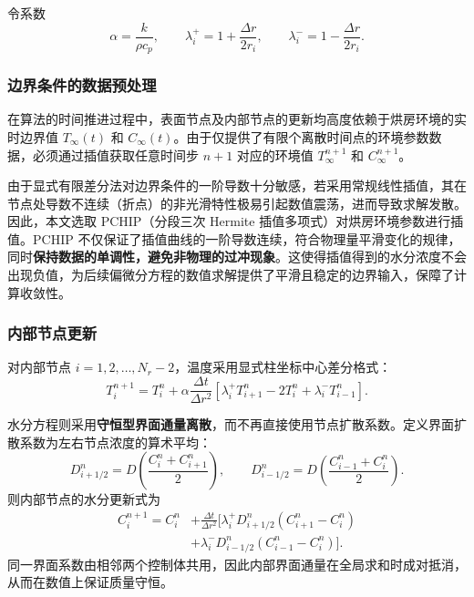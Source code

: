 \documentclass[withoutpreface,bwprint]{cumcm_thesis}
\begin{document}
令系数
\begin{equation}
\alpha = \frac{k}{\rho c_p}, \qquad \lambda_i^+ = 1 + \frac{\Delta r}{2r_i}, \qquad \lambda_i^- = 1 - \frac{\Delta r}{2r_i}.
\end{equation}

\subsubsection{边界条件的数据预处理}

在算法的时间推进过程中，表面节点及内部节点的更新均高度依赖于烘房环境的实时边界值 \(T_\infty(t)\) 和 \(C_\infty(t)\)。由于仅提供了有限个离散时间点的环境参数数据，必须通过插值获取任意时间步 \(n+1\) 对应的环境值 \(T_\infty^{n+1}\) 和 \(C_\infty^{n+1}\)。

由于显式有限差分法对边界条件的一阶导数十分敏感，若采用常规线性插值，其在节点处导数不连续（折点）的非光滑特性极易引起数值震荡，进而导致求解发散。因此，本文选取 PCHIP（分段三次 Hermite 插值多项式）对烘房环境参数进行插值。PCHIP 不仅保证了插值曲线的一阶导数连续，符合物理量平滑变化的规律，同时\textbf{保持数据的单调性，避免非物理的过冲现象}。这使得插值得到的水分浓度不会出现负值，为后续偏微分方程的数值求解提供了平滑且稳定的边界输入，保障了计算收敛性。

\subsubsection{内部节点更新}

对内部节点 \(i = 1,2,\dots,N_r-2\)，温度采用显式柱坐标中心差分格式：
\begin{equation}
T_i^{n+1} = T_i^n + \alpha \frac{\Delta t}{\Delta r^2} \left[ \lambda_i^+ T_{i+1}^n - 2T_i^n + \lambda_i^- T_{i-1}^n \right].
\end{equation}

水分方程则采用\textbf{守恒型界面通量离散}，而不再直接使用节点扩散系数。定义界面扩散系数为左右节点浓度的算术平均：
\begin{equation}
D_{i+1/2}^n = D\left( \frac{C_i^n + C_{i+1}^n}{2} \right), \qquad D_{i-1/2}^n = D\left( \frac{C_{i-1}^n + C_i^n}{2} \right).
\end{equation}
则内部节点的水分更新式为
\begin{equation}
\begin{aligned}
C_i^{n+1} = C_i^n &+ \frac{\Delta t}{\Delta r^2} \Big[ \lambda_i^+ D_{i+1/2}^n (C_{i+1}^n - C_i^n) \\
&+ \lambda_i^- D_{i-1/2}^n (C_{i-1}^n - C_i^n) \Big].
\end{aligned}
\end{equation}
同一界面系数由相邻两个控制体共用，因此内部界面通量在全局求和时成对抵消，从而在数值上保证质量守恒。
\end{document}
